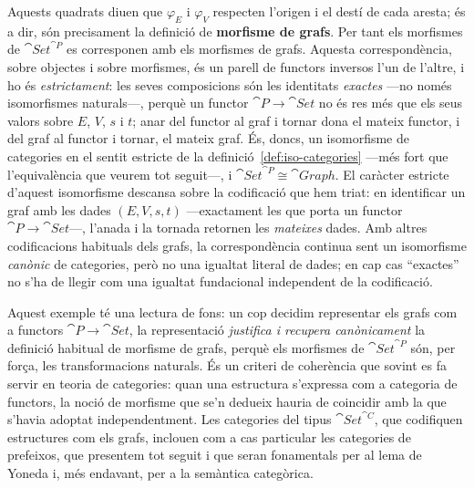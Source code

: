 \begin{prova}
Aquests quadrats diuen que $\varphi_E$ i $\varphi_V$ respecten l'origen i el destí de cada aresta; és a dir, són precisament la definició de \textbf{morfisme de grafs}. Per tant els morfismes de $\cat{Set}^{\cat{P}}$ es corresponen amb els morfismes de grafs. Aquesta correspondència, sobre objectes i sobre morfismes, és un parell de functors inversos l'un de l'altre, i ho és \emph{estrictament}: les seves composicions són les identitats \emph{exactes} ---no només isomorfismes naturals---, perquè un functor $\cat{P}\to\cat{Set}$ no és res més que els seus valors sobre $E$, $V$, $s$ i $t$; anar del functor al graf i tornar dona el mateix functor, i del graf al functor i tornar, el mateix graf. És, doncs, un isomorfisme de categories en el sentit estricte de la definició~\ref{def:iso-categories} ---més fort que l'equivalència que veurem tot seguit---, i $\cat{Set}^{\cat{P}}\cong\cat{Graph}$. El caràcter estricte d'aquest isomorfisme descansa sobre la codificació que hem triat: en identificar un graf amb les dades $(E,V,s,t)$ ---exactament les que porta un functor $\cat{P}\to\cat{Set}$---, l'anada i la tornada retornen les \emph{mateixes} dades. Amb altres codificacions habituals dels grafs, la correspondència continua sent un isomorfisme \emph{canònic} de categories, però no una igualtat literal de dades; en cap cas \enquote{exactes} no s'ha de llegir com una igualtat fundacional independent de la codificació.
\end{prova}

\begin{observacio}
Aquest exemple té una lectura de fons: un cop decidim representar els grafs com a functors $\cat{P}\to\cat{Set}$, la representació \emph{justifica i recupera canònicament} la definició habitual de morfisme de grafs, perquè els morfismes de $\cat{Set}^{\cat{P}}$ són, per força, les transformacions naturals. És un criteri de coherència que sovint es fa servir en teoria de categories: quan una estructura s'expressa com a categoria de functors, la noció de morfisme que se'n dedueix hauria de coincidir amb la que s'havia adoptat independentment. Les categories del tipus $\cat{Set}^{\cat{C}}$, que codifiquen estructures com els grafs, inclouen com a cas particular les categories de prefeixos, que presentem tot seguit i que seran fonamentals per al lema de Yoneda i, més endavant, per a la semàntica categòrica.
\end{observacio}


